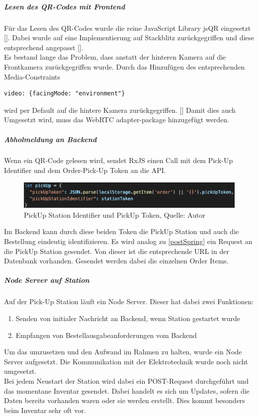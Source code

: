 \subparagraph{Lesen des QR-Codes mit Frontend}
Für das Lesen des QR-Codes wurde die reine JavaScript Library jsQR eingesetzt [\cite{jsQr}]. 
Dabei wurde auf eine Implementierung auf Stackblitz zurückgegriffen und diese entsprechend angepasst [\cite{jsQrStackblitz}]. \\
Es bestand lange das Problem, dass anstatt der hinteren Kamera auf die Frontkamera zurückgegriffen wurde. Durch das Hinzufügen des entsprechenden Media-Constraints \begin{verbatim}
video: {facingMode: "environment"}
\end{verbatim} wird per Default auf die hintere Kamera zurückgegriffen. [\cite{mediaStream}]
Damit dies auch Umgesetzt wird, muss das WebRTC adapter-package hinzugefügt werden. 
\subparagraph{Abholmeldung an Backend}
Wenn ein QR-Code gelesen wird, sendet \gls{RxJS} einen Call mit dem Pick-Up Identifier und dem Order-Pick-Up Token an die API. 
\begin{figure}[H]
	\centering
	\includegraphics[width=1\textwidth]{images/pickUpBody.PNG}
	\caption[PickUp Station Identifier und PickUp Token]{PickUp Station Identifier und PickUp Token, Quelle: Autor}
	\label{img: pickUpBody}
\end{figure} 
Im Backend kann durch diese beiden Token die PickUp Station und auch die Bestellung eindeutig identifizieren. 
Es wird analog zu \ref{postSpring} ein Request an die PickUp Station gesendet. Von dieser ist die entsprechende URL in der Datenbank vorhanden. Gesendet werden dabei die einzelnen Order Items. 
\subparagraph{Node Server auf Station}\label{nodeStation}
Auf der Pick-Up Station läuft ein Node Server. Dieser hat dabei zwei Funktionen: 
\begin{enumerate}
	\item Senden von initialer Nachricht an Backend, wenn Station gestartet wurde
	\item Empfangen von Bestellausgabeanforderungen vom Backend
\end{enumerate}
Um das umzusetzen und den Aufwand im Rahmen zu halten, wurde ein Node Server aufgesetzt. Die Kommunikation mit der Elektrotechnik wurde noch nicht umgesetzt. \\
Bei jedem Neustart der Station wird dabei ein POST-Request durchgeführt und das momentane Inventar gesendet. Dabei handelt es sich um Updates, sofern die Daten bereits vorhanden waren oder sie werden erstellt. Dies kommt besonders beim Inventar sehr oft vor. \\
